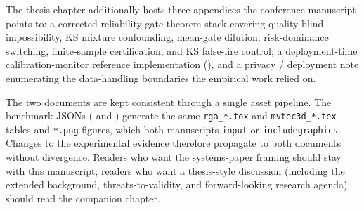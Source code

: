 \documentclass[10pt,conference]{IEEEtran}
\begin{document}
The thesis chapter additionally hosts three appendices the conference
manuscript points to: a corrected reliability-gate theorem stack covering
quality-blind impossibility, KS mixture confounding, mean-gate dilution,
risk-dominance switching, finite-sample certification, and KS false-fire
control; a deployment-time calibration-monitor reference implementation
(), and a privacy / deployment
note enumerating the data-handling boundaries the empirical work relied
on.

The two documents are kept consistent through a single asset pipeline. The
benchmark JSONs ( and
) generate the same
\texttt{rga\_*.tex} and \texttt{mvtec3d\_*.tex} tables and \texttt{*.png}
figures, which both manuscripts \texttt{input} or \texttt{includegraphics}.
Changes to the experimental evidence therefore propagate to both documents
without divergence. Readers who want the systems-paper framing should stay
with this manuscript; readers who want a thesis-style discussion (including
the extended background, threats-to-validity, and forward-looking research
agenda) should read the companion chapter.
\end{document}
